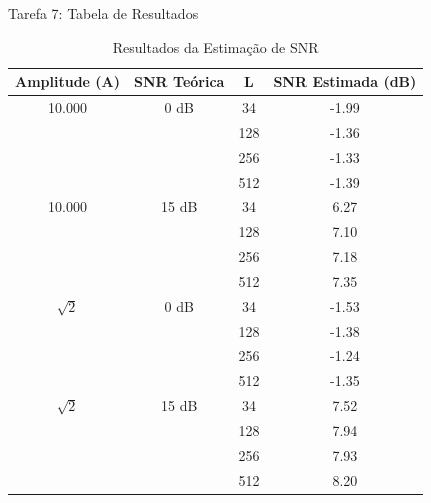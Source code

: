 \documentclass[10pt]{beamer}
\begin{document}
\begin{frame}{Tarefa 7: Tabela de Resultados}
    \begin{table}
        \centering
        \caption{Resultados da Estimação de SNR}
        \scriptsize %
        \begin{tabular}{cccc}
            \toprule
            \textbf{Amplitude (A)} & \textbf{SNR Teórica} & \textbf{L} & \textbf{SNR Estimada (dB)} \\
            \midrule
            
            10.000 & 0 dB  & 34  & -1.99 \\
                   &       & 128 & -1.36 \\
                   &       & 256 & -1.33 \\
                   &       & 512 & -1.39 \\
            \midrule
            
            10.000 & 15 dB & 34  & 6.27 \\
                   &       & 128 & 7.10 \\
                   &       & 256 & 7.18 \\
                   &       & 512 & 7.35 \\
            \midrule
            
            $\sqrt{2}$  & 0 dB  & 34  & -1.53 \\
                   &       & 128 & -1.38 \\
                   &       & 256 & -1.24 \\
                   &       & 512 & -1.35 \\
            \midrule
            
            $\sqrt{2}$  & 15 dB & 34  & 7.52 \\
                   &       & 128 & 7.94 \\
                   &       & 256 & 7.93 \\
                   &       & 512 & 8.20 \\
            \bottomrule
    \end{tabular}
    \end{table}
\end{frame}
\end{document}
